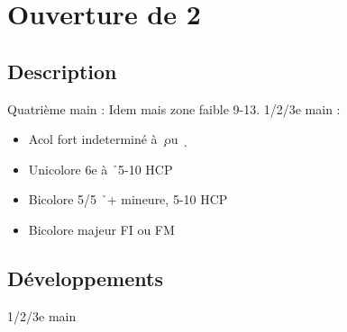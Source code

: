 \documentclass[a4paper]{article}
\begin{document}
\section{Ouverture de 2\pdfd}

\subsection{Description}

Quatrième main : Idem mais zone faible 9-13.
1/2/3e main :

\begin{itemize}
\item Acol fort indeterminé à \c\ ou \d\ 

\item Unicolore 6e à \h\ 5-10 HCP 

\item Bicolore 5/5 \h\ + mineure, 5-10 HCP

\item Bicolore majeur FI ou FM

\end{itemize}

\subsection{Développements}

1/2/3e main
\end{document}
